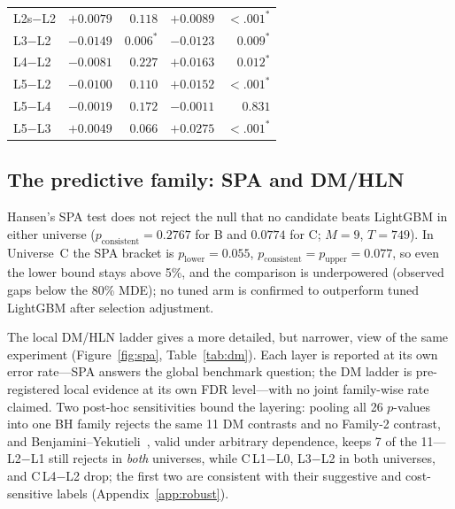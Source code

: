 \documentclass{article}
\begin{document}
\begin{table}[t]
\begin{minipage}[t]{0.51\textwidth}
\begin{tabular}{@{}l rr rr@{}}
      L2s$-$L2& $+0.0079$ & $0.118$ & $+0.0089$ & $<.001^\ast$ \\
      L3$-$L2 & $-0.0149$ & $0.006^\ast$ & $-0.0123$ & $0.009^\ast$ \\
      L4$-$L2 & $-0.0081$ & $0.227$ & $+0.0163$ & $0.012^\ast$ \\
      L5$-$L2 & $-0.0100$ & $0.110$ & $+0.0152$ & $<.001^\ast$ \\
      L5$-$L4 & $-0.0019$ & $0.172$ & $-0.0011$ & $0.831$ \\
      L5$-$L3 & $+0.0049$ & $0.066$ & $+0.0275$ & $<.001^\ast$ \\
      \bottomrule
    \end{tabular}
  \end{minipage}
\end{table}

\subsection{The predictive family: SPA and DM/HLN}\label{sec:spa}
Hansen's SPA test does not reject the null that no candidate beats LightGBM in either universe ($p_{\text{consistent}}=0.2767$ for B and $0.0774$ for C; $M=9$, $T=749$). In Universe~C the SPA bracket is $p_{\text{lower}}=0.055$, $p_{\text{consistent}}=p_{\text{upper}}=0.077$, so even the lower bound stays above 5\%, and the comparison is underpowered (observed gaps below the 80\% MDE); no tuned arm is confirmed to outperform tuned LightGBM after selection adjustment.

The local DM/HLN ladder gives a more detailed, but narrower, view of the same experiment (Figure~\ref{fig:spa}, Table~\ref{tab:dm}). Each layer is reported at its own error rate---SPA answers the global benchmark question; the DM ladder is pre-registered local evidence at its own FDR level---with no joint family-wise rate claimed. Two post-hoc sensitivities bound the layering: pooling all 26 $p$-values into one BH family rejects the same 11 DM contrasts and no Family-2 contrast, and Benjamini--Yekutieli~\citep{benjamini2001by}, valid under arbitrary dependence, keeps 7 of the 11---L2$-$L1 still rejects in \emph{both} universes, while C\,L1$-$L0, L3$-$L2 in both universes, and C\,L4$-$L2 drop; the first two are consistent with their suggestive and cost-sensitive labels (Appendix~\ref{app:robust}).
\end{document}
